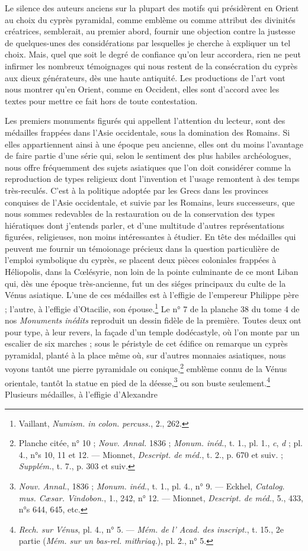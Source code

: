 \documentclass[a4paper, 11pt, oneside, polutonikogreek, french]{article}
\begin{document}
Le silence des auteurs anciens sur la plupart des motifs qui présidèrent en Orient au choix du cyprès pyramidal, comme emblème ou comme attribut des divinités créatrices, semblerait, au premier abord, fournir une objection contre la justesse de quelques-unes des considérations par lesquelles je cherche à expliquer un tel choix. Mais, quel que soit le degré de confiance qu'on leur accordera, rien ne peut infirmer les nombreux témoignages qui nous restent de la consécration du cyprès aux dieux générateurs, dès une haute antiquité. Les productions de l'art vont nous montrer qu'en Orient, comme en Occident, elles sont d'accord avec les textes pour mettre ce fait hors de toute contestation.

Les premiers monuments figurés qui appellent l'attention du lecteur, sont des médailles frappées dans l'Asie occidentale, sous la domination des Romains. Si elles appartiennent ainsi à une époque peu ancienne, elles ont du moins l'avantage de faire partie d'une série qui, selon le sentiment des plus habiles archéologues, nous offre fréquemment des sujets asiatiques que l'on doit considérer comme la reproduction de types religieux dont l'invention et l'usage remontent à des temps très-reculés. C'est à la politique adoptée par les Grecs dans les provinces conquises de l'Asie occidentale, et suivie par les Romains, leurs successeurs, que nous sommes redevables de la restauration ou de la conservation des types hiératiques dont j'entends parler, et d'une multitude d'autres représentations figurées, religieuses, non moins intéressantes à étudier. En tête des médailles qui peuvent me fournir un témoionage précieux dans la question particulière de l'emploi symbolique du cyprès, se placent deux pièces coloniales frappées à Héliopolis, dans la Cœlésyrie, non loin de la pointe culminante de ce mont Liban qui, dès une époque très-ancienne, fut un des siéges principaux du culte de la Vénus asiatique. L'une de ces médailles est à l'effigie de l'empereur Philippe père ; l'autre, à l'effigie d'Otacilie, son épouse.\footnote{Vaillant, \emph{Numism. in colon. percuss.}, 2., 262.} Le n° 7 de la planche 38 du tome 4 de nos \emph{Monuments inédits} reproduit un dessin fidèle de la première. Toutes deux ont pour type, à leur revers, la façade d'un temple dodécastyle, où l'on monte par un escalier de six marches ; sous le péristyle de cet édifice on remarque un cyprès pyramidal, planté à la place même où, sur d'autres monnaies asiatiques, nous voyons tantôt une pierre pyramidale ou conique,\footnote{Planche citée, n° 10 ; \emph{Nouv. Annal.} 1836 ; \emph{Monum. inéd.}, t. 1., pl. 1., \emph{c}, \emph{d} ; pl. 4., n°s 10, 11 et 12. --- Mionnet, \emph{Descript. de méd.}, t. 2., p. 670 et suiv. ; \emph{Supplém.}, t. 7., p. 303 et suiv.} emblème connu de la Vénus orientale, tantôt la statue en pied de la déesse,\footnote{\emph{Nouv. Annal.}, 1836 ; \emph{Monum. inéd.}, t. 1., pl. 4., n° 9. --- Eckhel, \emph{Catalog. mus. Cæsar. Vindobon.}, 1., 242, n° 12. --- Mionnet, \emph{Descript. de méd.}, 5., 433, n°s 644, 645, etc.} ou son buste seulement.\footnote{\emph{Rech. sur Vénus}, pl. 4., n° 5. --- \emph{Mém. de l' Acad. des inscript.}, t. 15., 2e partie (\emph{Mém. sur un bas-rel. mithriaq.}), pl. 2., n° 5.} Plusieurs médailles, à l'effigie d'Alexandre 
\end{document}
